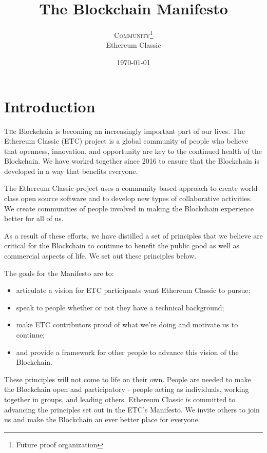 \documentclass[twoside,twocolumn]{article}
\title{The Blockchain Manifesto} %
\author{%
\textsc{Community}\thanks{Future proof organization}
\\[1ex]
\normalsize Ethereum Classic \\ %
}
\date{\today} %
\begin{document}
\maketitle

\section{Introduction}

\lettrine[nindent=0em,lines=3]{T}he Blockchain is becoming an increasingly
important part of our lives. The Ethereum Classic (ETC) project is a global
community of people who believe that openness, innovation, and opportunity are
key to the continued health of the Blockchain. We have worked together since
2016 to ensure that the Blockchain is developed in a way that benefits everyone.

The Ethereum Classic project uses a community based approach to create
world-class open source software and to develop new types of collaborative
activities. We create communities of people involved in making the Blockchain
experience better for all of us.

As a result of these efforts, we have distilled a set of principles that we
believe are critical for the Blockchain to continue to benefit the public good
as well as commercial aspects of life. We set out these principles below.

The goals for the Manifesto are to:

\begin{itemize}
  \item articulate a vision for ETC participants want
  Ethereum Classic to pursue;
  \item speak to people whether or not they have a technical
background;
  \item make ETC contributors proud of what we're doing and motivate us
to continue;
  \item and provide a framework for other people to advance this vision of
the Blockchain.
\end{itemize}

These principles will not come to life on their own. People are needed to make
the Blockchain open and participatory - people acting as individuals, working
together in groups, and leading others. Ethereum Classic is
committed to advancing the principles set out in the ETC's Manifesto. We
invite others to join us and make the Blockchain an ever better place for
everyone.
\end{document}

